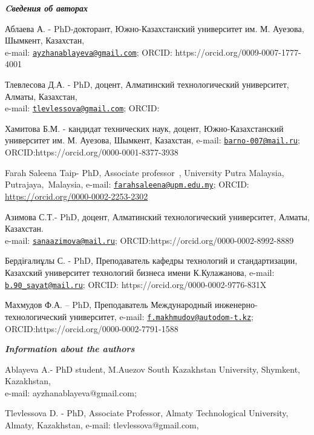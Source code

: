 \begin{authorinfo}
\emph{{\bfseries Cведения об авторах}}

Аблаева А. - PhD-докторант, Южно-Казахстанский университет им. М.
Ауезова, Шымкент, Казахстан,\\
e-mail:
\href{mailto:ayzhanablayeva@gmail.com}{\nolinkurl{ayzhanablayeva@gmail.com}};
ORCID: https://orcid.org/0009-0007-1777-4001

Тлевлесова Д.А. - PhD, доцент, Алматинский технологический университет,
Алматы, Казахстан,\\
e-mail:
\href{mailto:tlevlessova@gmail.com}{\nolinkurl{tlevlessova@gmail.com}};
ORCID:
\href{https://orcid.org/0000-0002-5084-6587}{}

Хамитова Б.М. - кандидат технических наук, доцент, Южно-Казахстанский
университет им. М. Ауезова, Шымкент, Казахстан, e-mail:
\href{mailto:barno-007@mail.ru}{\nolinkurl{barno-007@mail.ru}};
ORCID:https://orcid.org/0000-0001-8377-3938

Farah Saleena Taip- PhD, Associate professor~, University Putra
Malaysia, Putrajaya,~Malaysia, e-mail:
\href{mailto:farahsaleena@upm.edu.my}{\nolinkurl{farahsaleena@upm.edu.my}};
ORCID: \url{https://orcid.org/0000-0002-2253-2302}

Азимова С.Т.- PhD, доцент, Алматинский технологический университет,
Алматы, Казахстан.\\
e-mail:
\href{mailto:sanaazimova@mail.ru}{\nolinkurl{sanaazimova@mail.ru}};
ORCID:https://orcid.org/0000-0002-8992-8889

Бердіғалиұлы С. - PhD, Преподаватель кафедры технологий и
стандартизации, Казахский университет технологий бизнеса имени
К.Кулажанова, e-mail:
\href{mailto:b.90\_sayat@mail.ru}{\nolinkurl{b.90\_sayat@mail.ru}};
ORCID: https://orcid.org/0000-0002-9776-831X

Махмудов Ф.А. -- PhD, Преподаватель Международный
инженерно-технологический университет, e-mail:
\href{mailto:f.makhmudov@autodom-t.kz}{\nolinkurl{f.makhmudov@autodom-t.kz}};
ORCID:https://orcid.org/0000-0002-7791-1588

\emph{{\bfseries Information about the authors}}

Ablayeva A.- PhD student, M.Auezov South Kazakhstan University,
Shymkent, Kazakhstan,\\
e-mail: ayzhanablayeva@gmail.com;

Tlevlessova D. - PhD, Associate Professor, Almaty Technological
University, Almaty, Kazakhstan, e-mail: tlevlessova@gmail.com,


\end{authorinfo}
